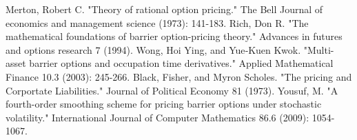 \documentclass[11pt]{article}
\begin{document}
\begin{thebibliography}{MMMMM} 
 Merton, Robert C. "Theory of rational option pricing." The Bell Journal of economics and management science (1973): 141-183.
 Rich, Don R. "The mathematical foundations of barrier option-pricing theory." Advances in futures and options research 7 (1994).
 Wong, Hoi Ying, and Yue‐Kuen Kwok. "Multi-asset barrier options and occupation time derivatives." Applied Mathematical Finance 10.3 (2003): 245-266.
Black, Fisher, and Myron Scholes. "The pricing and Corportate Liabilities." Journal of Political Economy 81 (1973).
 Yousuf, M. "A fourth-order smoothing scheme for pricing barrier options under stochastic volatility." International Journal of Computer Mathematics 86.6 (2009): 1054-1067.

\end{thebibliography}


\end{document}
